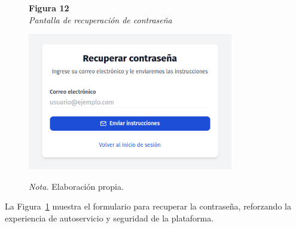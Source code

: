  \begin{figure}[htbp]
    \begin{flushleft}
        \textbf{Figura 12}\\[2em]
        \textit{Pantalla de recuperación de contraseña}
    \end{flushleft}
    \vspace{1em}
    \centering
    \includegraphics[width=0.8\textwidth]{Images/UI2.png}
    \vspace{2em}
    \begin{flushleft}
        \textit{Nota.} Elaboración propia.
    \end{flushleft}
    \label{fig:recuperar_password}
\end{figure}
La Figura~\ref{fig:recuperar_password} muestra el formulario para recuperar la contraseña, reforzando la experiencia de autoservicio y seguridad de la plataforma.
